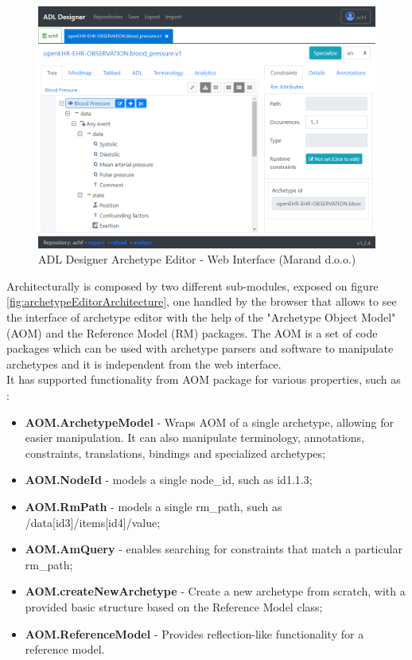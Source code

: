 \documentclass[mim_thesis.tex]{subfiles}
\begin{document}
\begin{figure}[H]
	\centering
    \includegraphics[width=1\textwidth]{img/archetype_editor_adldesigner.PNG}
	\caption{ADL Designer Archetype Editor - Web Interface (Marand d.o.o.)}
	\label{fig:archetypeEditor}
\end{figure}

Architecturally is composed by two different sub-modules, exposed on figure \ref{fig:archetypeEditorArchitecture}, one handled by the browser that allows to see the interface of archetype editor with the help of the "Archetype Object Model" (AOM) and the Reference Model (RM) packages. The AOM is a set of code packages which can be used with archetype parsers and software to manipulate archetypes and it is independent from the web interface. \\
\newpage
It has supported functionality from AOM package for various properties, such as \citep{openEHRALD2016}:
\begin{itemize}[noitemsep]
\item \textbf{AOM.ArchetypeModel} - Wraps AOM of a single archetype, allowing for easier manipulation. It can also manipulate terminology, annotations, constraints, translations, bindings and specialized archetypes;
\item \textbf{AOM.NodeId} - models a single node\_id, such as id1.1.3;
\item \textbf{AOM.RmPath} - models a single rm\_path, such as /data[id3]/items[id4]/value;
\item \textbf{AOM.AmQuery} - enables searching for constraints that match a particular rm\_path;
\item \textbf{AOM.createNewArchetype} - Create a new archetype from scratch, with a provided basic structure based on the Reference Model class;
\item \textbf{AOM.ReferenceModel} - Provides reflection-like functionality for a reference model.
\end{itemize}
\end{document}

